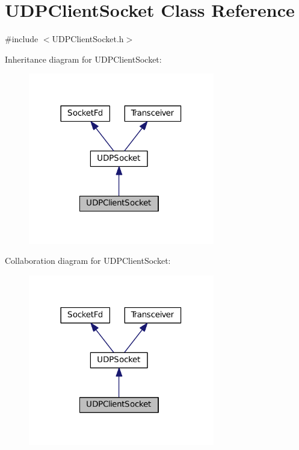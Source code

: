 \hypertarget{classUDPClientSocket}{\section{U\+D\+P\+Client\+Socket Class Reference}
\label{classUDPClientSocket}
}


{\ttfamily \#include $<$U\+D\+P\+Client\+Socket.\+h$>$}



Inheritance diagram for U\+D\+P\+Client\+Socket\+:
\nopagebreak
\begin{figure}[H]
\begin{center}
\leavevmode
\includegraphics[width=230pt]{classUDPClientSocket__inherit__graph}
\end{center}
\end{figure}


Collaboration diagram for U\+D\+P\+Client\+Socket\+:
\nopagebreak
\begin{figure}[H]
\begin{center}
\leavevmode
\includegraphics[width=230pt]{classUDPClientSocket__coll__graph}
\end{center}
\end{figure}
